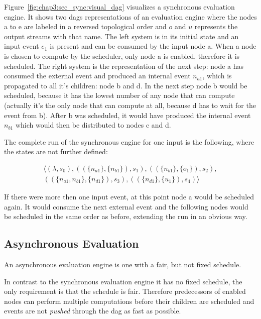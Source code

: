 Figure~\ref{fig:chap3:sec_sync:visual_dag} visualizes a synchronous evaluation engine.
It shows two \glspl{dag} representations of an evaluation engine  where the nodes a to e are labeled in a reversed topological order and \(o\) and \(u\) represents the output streams with that name.
The left system is in its initial state and an input event \(e_1\) is present and can be consumed by the input node a.
When a node is chosen to compute by the scheduler, only node a is enabled, therefore it is scheduled.
The right system is the representation of the next step: node a has consumed the external event and produced an internal event \(n_{a1}\), which is propagated to all it's children: node b and d.
In the next step node b would be scheduled, because it has the lowest number of any node that can compute (actually it's the only node that can compute at all, because d has to wait for the event from b).
After b was scheduled, it would have produced the internal event \(n_{b1}\) which would then be distributed to nodes c and d.

The complete run of the synchronous engine for one input is the following, where the states are not further defined:

\begin{align*}
  \langle
    (\lambda,                             s_0),
    ((\{ n_{a1}         \}, \{n_{b1}\}),  s_1),
    ((\{ n_{b1}         \}, \{o_1\}),     s_2),\\
    ((\{ n_{a1}, n_{b1} \}, \{n_{d1}\}),  s_3),
    ((\{ n_{d1}         \}, \{u_1\}),     s_4)
  \rangle
\end{align*}

If there were more then one input event, at this point node a would be scheduled again.
It would consume the next external event and the following nodes would be scheduled in the same order as before, extending the run in an obvious way.

\subsection{Asynchronous Evaluation}
\label{sec:concepts:behaviour_without_timing:async}

An asynchronous evaluation engine is one with a fair, but not fixed schedule.

In contrast to the synchronous evaluation engine it has no fixed schedule, the only requirement is that the schedule is fair.
Therefore predecessors of enabled nodes can perform multiple computations before their children are scheduled and events are not \emph{pushed} through the \gls{dag} as fast as possible.

